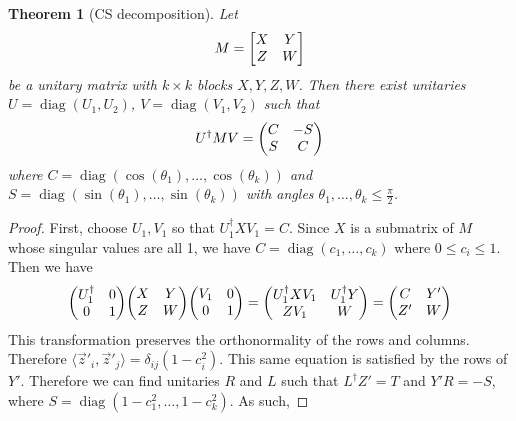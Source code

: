 \documentclass[11pt]{article}
\newtheorem{thm}{Theorem}
\newcommand{\diag}{\operatorname{diag}}
\begin{document}
\begin{thm}[CS decomposition]
Let
\begin{align}
    M = \mqty[X & Y \\ Z & W]
\end{align}
be a unitary matrix with $k \times k$ blocks $X, Y, Z, W$. Then there exist unitaries $U = \diag(U_1, U_2)$, $V = \diag(V_1, V_2)$ such that
$$
U^\dagger M V = \mqty(C & -S \\ S & C)
$$
where $C = \diag(\cos(\theta_1), \dots, \cos(\theta_k))$ and $S = \diag(\sin(\theta_1), \dots, \sin(\theta_k))$ with angles $\theta_1, \dots, \theta_k \leq \frac{\pi}{2}$.
\end{thm}
\begin{proof}
    First, choose $U_1, V_1$ so that $U_1^\dagger X V_1 = C$. Since $X$ is a submatrix of $M$ whose singular values are all 1, we have $C = \diag(c_1, \dots, c_k)$ where $0 \leq c_i \leq 1$. Then we have
    $$
    \mqty(U_1^\dagger & 0 \\ 0 & 1)\mqty(X & Y \\ Z & W) \mqty(V_1 & 0 \\ 0 & 1) = \mqty(U_1^\dagger X V_1 & U_1^\dagger Y \\ ZV_1 & W) = \mqty(C & Y' \\ Z' & W)
    $$
    This transformation preserves the orthonormality of the rows and columns. Therefore $\langle \vec z'_i, \vec z'_j \rangle = \delta_{ij}(1-c_i^2)$. This same equation is satisfied by the rows of $Y'$. Therefore we can find unitaries $R$ and $L$ such that $L^\dagger Z' = T$ and $Y'R = -S$, where $S = \diag(1-c_1^2, \dots, 1-c_k^2)$. As such,


\end{proof}
\end{document}
